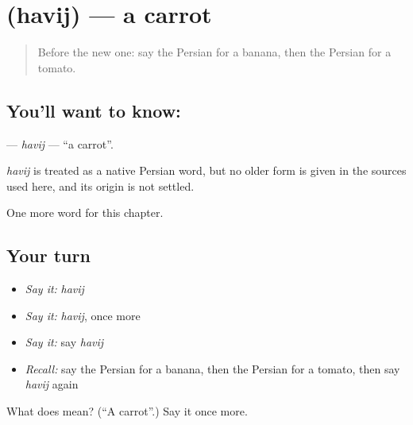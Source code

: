 \section[\texorpdfstring{\fa{هویج} (havij)}{هویج (havij)}]{ (havij) — a carrot}

\label{lesson:FA-C41-havij}



\begin{quote}
Before the new one: say the Persian for a banana, then the Persian for a tomato.
\end{quote}

\subsection*{You'll want to know: }
\textbf{} — \emph{havij} — \textquotedblleft{}a carrot\textquotedblright{}.

\begin{cousinweb}
\emph{havij} is treated as a native Persian word, but no older form is given in the sources used here, and its origin is not settled.
\end{cousinweb}

\begin{grammarlens}[title={What you've built}]
One more word for this chapter.
\end{grammarlens}

\subsection*{Your turn}
\begin{itemize}
\raggedright
  \item \emph{Say it:} \emph{havij}
  \item \emph{Say it:} \emph{havij}, once more
  \item \emph{Say it:} say \emph{havij}
  \item \emph{Recall:} say the Persian for a banana, then the Persian for a tomato, then say \emph{havij} again
\end{itemize}

\begin{tcolorbox}[breakable,colback=teal!4,colframe=teal!35!black,title={Before you move on}]
What does  mean? (\textquotedblleft{}A carrot\textquotedblright{}.) Say it once more.
\end{tcolorbox}
